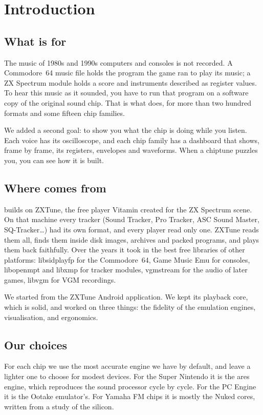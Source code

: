 \chapter{Introduction}

\section{What \soft is for}
The music of 1980s and 1990s computers and consoles is not recorded. A Commodore~64 music file holds the program the
game ran to play its music; a ZX Spectrum module holds a score and instruments described as register values. To
hear this music as it sounded, you have to run that program on a software copy of the original sound chip. That is
what \soft does, for more than two hundred formats and some fifteen chip families.

We added a second goal: to show you what the chip is doing while you listen. Each voice has its oscilloscope, and
each chip family has a dashboard that shows, frame by frame, its registers, envelopes and waveforms. When a chiptune
puzzles you, you can see how it is built.

\section{Where \soft comes from}
\soft builds on ZXTune, the free player Vitamin created for the ZX Spectrum scene. On that machine every tracker
(Sound Tracker, Pro Tracker, ASC Sound Master, SQ-Tracker\dots) had its own format, and every player read only one.
ZXTune reads them all, finds them inside disk images, archives and packed programs, and plays them back faithfully.
Over the years it took in the best free libraries of other platforms: libsidplayfp for the Commodore~64, Game Music
Emu for consoles, libopenmpt and libxmp for tracker modules, vgmstream for the audio of later games, libvgm for VGM
recordings.

We started from the ZXTune Android application. We kept its playback core, which is solid, and worked on three
things: the fidelity of the emulation engines, visualisation, and ergonomics.

\section{Our choices}
For each chip we use the most accurate engine we have by default, and leave a lighter one to choose for modest
devices. For the Super Nintendo it is the ares engine, which reproduces the sound processor cycle by cycle. For the
PC Engine it is the Ootake emulator's. For Yamaha FM chips it is mostly the Nuked cores, written from a study of
the silicon.

